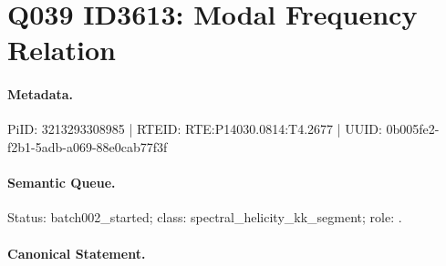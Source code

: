 \section*{Q039 ID3613: Modal Frequency Relation}
\paragraph{Metadata.}
PiID: 3213293308985 | RTEID: RTE:P14030.0814:T4.2677 | UUID: 0b005fe2-f2b1-5adb-a069-88e0cab77f3f

\paragraph{Semantic Queue.}
Status: batch002\_started; class: spectral\_helicity\_kk\_segment; role: .

\paragraph{Canonical Statement.}
